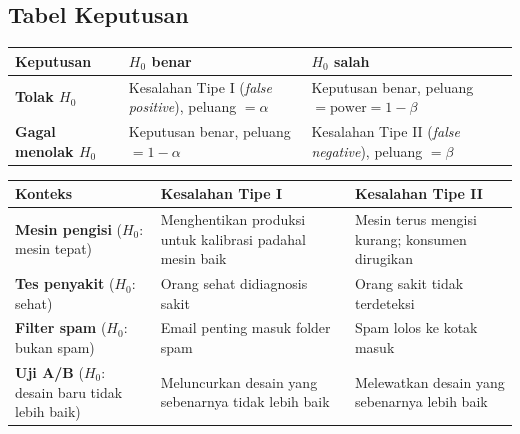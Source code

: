 \documentclass[
  indonesian,
  letterpaper,
]{book}
\newcounter{none} %
\begin{document}
\subsection{Tabel Keputusan}\label{tabel-keputusan}

{\def\LTcaptype{none} %
\begin{longtable}[]{@{}
  >{\raggedright\arraybackslash}p{}
  >{\raggedright\arraybackslash}p{}
  >{\raggedright\arraybackslash}p{}@{}}
\toprule\noalign{}
\begin{minipage}[b]{\linewidth}\raggedright
Keputusan
\end{minipage} & \begin{minipage}[b]{\linewidth}\raggedright
\(H_0\) benar
\end{minipage} & \begin{minipage}[b]{\linewidth}\raggedright
\(H_0\) salah
\end{minipage} \\
\midrule\noalign{}
\endhead
\bottomrule\noalign{}
\endlastfoot
\textbf{Tolak \(H_0\)} & Kesalahan Tipe I (\emph{false positive}),
peluang \(= \alpha\) & Keputusan benar, peluang
\(= \text{power} = 1 - \beta\) \\
\textbf{Gagal menolak \(H_0\)} & Keputusan benar, peluang
\(= 1 - \alpha\) & Kesalahan Tipe II (\emph{false negative}), peluang
\(= \beta\) \\
\end{longtable}
}

{\def\LTcaptype{none} %
\begin{longtable}[]{@{}
  >{\raggedright\arraybackslash}p{}
  >{\raggedright\arraybackslash}p{}
  >{\raggedright\arraybackslash}p{}@{}}
\toprule\noalign{}
\begin{minipage}[b]{\linewidth}\raggedright
Konteks
\end{minipage} & \begin{minipage}[b]{\linewidth}\raggedright
Kesalahan Tipe I
\end{minipage} & \begin{minipage}[b]{\linewidth}\raggedright
Kesalahan Tipe II
\end{minipage} \\
\midrule\noalign{}
\endhead
\bottomrule\noalign{}
\endlastfoot
\textbf{Mesin pengisi} (\(H_0\): mesin tepat) & Menghentikan produksi
untuk kalibrasi padahal mesin baik & Mesin terus mengisi kurang;
konsumen dirugikan \\
\textbf{Tes penyakit} (\(H_0\): sehat) & Orang sehat didiagnosis sakit &
Orang sakit tidak terdeteksi \\
\textbf{Filter spam} (\(H_0\): bukan spam) & Email penting masuk folder
spam & Spam lolos ke kotak masuk \\
\textbf{Uji A/B} (\(H_0\): desain baru tidak lebih baik) & Meluncurkan
desain yang sebenarnya tidak lebih baik & Melewatkan desain yang
sebenarnya lebih baik \\
\end{longtable}
}
\end{document}
